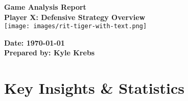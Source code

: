 \documentclass[a4paper,12pt]{article}
\begin{document}
\begin{titlepage}
    \centering
    {\Huge \textbf{Game Analysis Report}}\\[1.5cm]
    
    {\Large \textbf{Player X: Defensive Strategy Overview}}\\[2cm]
    
    \texttt{[image: images/rit-tiger-with-text.png]} %
    
    \vfill
    
    \textbf{Date: \today}\\[1cm]
    \textbf{Prepared by: Kyle Krebs}
\end{titlepage}

\section*{Key Insights \& Statistics}

\vspace{1em}
\end{document}

